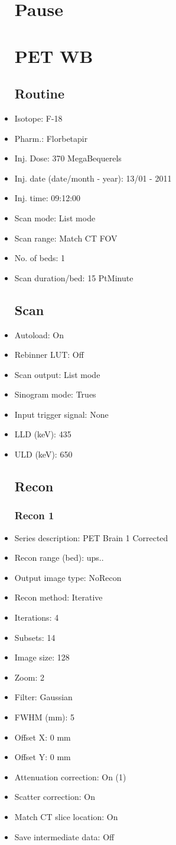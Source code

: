 \documentclass[12pt]{article}
\begin{document}
\begin{itemize}
\section{Pause}

\section{PET WB}
\subsection{Routine}
\item Isotope: F-18
\item Pharm.: Florbetapir
\item Inj. Dose: 370 MegaBequerels
\item Inj. date (date/month - year): 13/01 - 2011
\item Inj. time: 09:12:00
\item Scan mode: List mode
\item Scan range: Match CT FOV
\item No. of beds: 1
\item Scan duration/bed: 15 PtMinute
\subsection{Scan}
\item Autoload: On
\item Rebinner LUT: Off
\item Scan output: List mode
\item Sinogram mode: Trues
\item Input trigger signal: None
\item LLD (keV): 435
\item ULD (keV): 650
\subsection{Recon}

\subsubsection{Recon 1}
\item Series description: PET Brain 1 Corrected
\item Recon range (bed): ups..
\item Output image type: NoRecon
\item Recon method: Iterative
\item Iterations: 4
\item Subsets: 14
\item Image size: 128
\item Zoom: 2
\item Filter: Gaussian
\item FWHM (mm): 5
\item Offset X: 0 mm
\item Offset Y: 0 mm
\item Attenuation correction: On (1)
\item Scatter correction: On
\item Match CT slice location: On
\item Save intermediate data: Off
\end{itemize}
\end{document}
